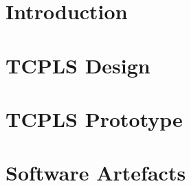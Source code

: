 \section{Introduction}







\section{TCPLS Design}\label{sec:design}






\section{TCPLS Prototype}\label{sec:prototype}










%


%


%


\section*{Software Artefacts}


